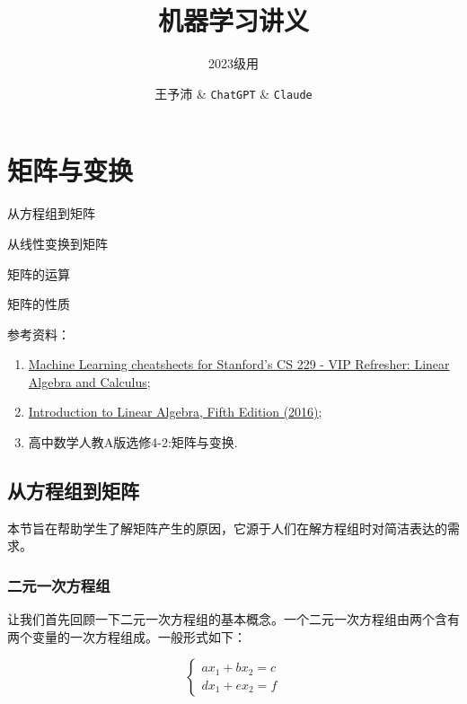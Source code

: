 \documentclass[lang=cn,newtx,10pt,scheme=chinese]{elegantbook}
\title{机器学习讲义}
\subtitle{2023级用}
\author{王予沛 \& \texttt{ChatGPT} \& \texttt{Claude}}
\institute{北京师范大学数字人文系}
\begin{document}
\maketitle
\frontmatter

\tableofcontents

\mainmatter

\chapter{矩阵与变换}

\begin{introduction}
  \item 从方程组到矩阵
  \item 从线性变换到矩阵
  \item 矩阵的运算
  \item 矩阵的性质
\end{introduction}

参考资料：
\begin{enumerate}
    \item \href{https://github.com/afshinea/stanford-cs-229-machine-learning/blob/master/zh/refresher-algebra-calculus.pdf}{Machine Learning cheatsheets for Stanford's CS 229 - VIP Refresher: Linear Algebra and Calculus};
    \item \href{https://math.mit.edu/~gs/linearalgebra/ila5/indexila5.html}{Introduction to Linear Algebra, Fifth Edition (2016)};
    \item 高中数学人教A版选修4-2:矩阵与变换.
\end{enumerate}

\section{从方程组到矩阵}
\label{sec:origin_of_matrix}

\begin{note}
本节旨在帮助学生了解矩阵产生的原因，它源于人们在解方程组时对简洁表达的需求。
\end{note}

\subsection{二元一次方程组}
\label{subsec:二元一次方程组}

让我们首先回顾一下二元一次方程组的基本概念。一个二元一次方程组由两个含有两个变量的一次方程组成。一般形式如下：

\begin{equation}
\left\{
\begin{array}{l}
ax_1 + bx_2 = c\\
dx_1 + ex_2 = f
\end{array}
\right.
\label{eq:二元一次方程组通式}
\end{equation}
\end{document}
